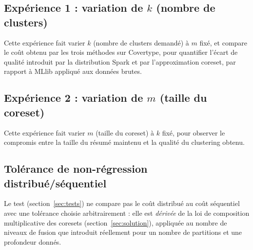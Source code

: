 \subsection{Expérience 1 : variation de $k$ (nombre de clusters)}

Cette expérience fait varier $k$ (nombre de clusters demandé) à $m$ fixé, et
compare le coût obtenu par les trois méthodes sur Covertype, pour quantifier
l'écart de qualité introduit par la distribution Spark et par
l'approximation coreset, par rapport à MLlib appliqué aux données brutes.


\subsection{Expérience 2 : variation de $m$ (taille du coreset)}

Cette expérience fait varier $m$ (taille du coreset) à $k$ fixé, pour
observer le compromis entre la taille du résumé maintenu et la qualité du
clustering obtenu.


\subsection{Tolérance de non-régression distribué/séquentiel}
\label{sec:tolerance-derivation}

Le test  (section~\ref{sec:tests}) ne compare pas le coût
distribué au coût séquentiel avec une tolérance choisie arbitrairement : elle
est \emph{dérivée} de la loi de composition multiplicative des coresets
(section~\ref{sec:solution}), appliquée au nombre de niveaux de fusion que
 introduit réellement pour un nombre de partitions et
une profondeur donnés.

